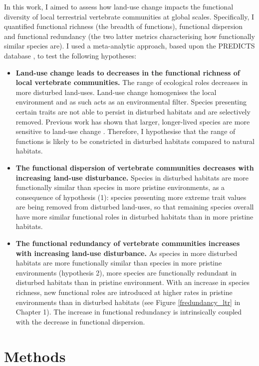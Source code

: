 In this work, I aimed to assess how land-use change impacts the functional diversity of local terrestrial vertebrate communities at global scales. Specifically, I quantified functional richness (the breadth of functions), functional dispersion and functional redundancy (the two latter metrics characterising how functionally similar species are).
I used a meta-analytic approach, based upon the PREDICTS database \citep{Hudson2014, Hudson2017}, to test the following hypotheses:
\begin{itemize}
\item \textbf{Land-use change leads to decreases in the functional richness of local vertebrate communities.} The range of ecological roles decreases in more disturbed land-uses. Land-use change homogenises the local environment and as such acts as an environmental filter. Species presenting certain traits are not able to persist in disturbed habitats and are selectively removed. Previous work has shown that larger, longer-lived species are more sensitive to land-use change \citep{Newbold2013}. Therefore, I hypothesise that the range of functions is likely to be constricted in disturbed habitats compared to natural habitats. 
\item \textbf{The functional dispersion of vertebrate communities decreases with increasing land-use disturbance.} Species in disturbed habitats are more functionally similar than species in more pristine environments, as a consequence of hypothesis (1): species presenting more extreme trait values are being removed from disturbed land-uses, so that remaining species overall have more similar functional roles in disturbed habitats than in more pristine habitats. 
\item\textbf{The functional redundancy of vertebrate communities increases with increasing land-use disturbance.} As species in more disturbed habitats are more functionally similar than species in more pristine environments (hypothesis 2), more species are functionally redundant in disturbed habitats than in pristine environment. With an increase in species richness, new functional roles are introduced at higher rates in pristine environments than in disturbed habitats (see Figure \ref{fredundancy_ltr} in Chapter 1). The increase in functional redundancy is intrinsically coupled with the decrease in functional dispersion. 
\end{itemize}


\section{Methods}

